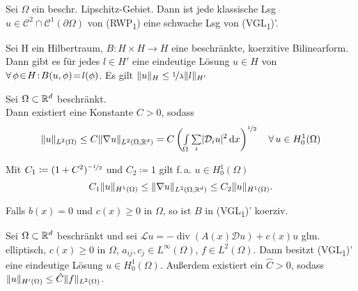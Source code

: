 \documentclass{cheat-sheet}
\newcommand{\Cont}{\mathcal{C}} %
\newcommand{\bOmega}{\partial \Omega} %
\DeclareMathOperator{\dive}{div} %
\newcommand{\tss}[1]{\textsubscript{#1}} %
\newcommand{\DO}{\mathcal{D}} %
\begin{document}
\begin{satz}
  Sei $\Omega$ ein beschr. Lipschitz-Gebiet.
  Dann ist jede klassische Lsg $u \in \Cont^2 \cap \Cont^1(\bOmega)$ von (RWP\tss{1}) eine schwache Lsg von (VGL\tss{1})'.
\end{satz}


\begin{satz}
  Sei H ein Hilbertraum, $B : H \times H \to H$ eine beschränkte, koerzitive Bilinearform.
  Dann gibt es für jedes $l \in H'$ eine eindeutige Lösung $u \in H$ von  $\fa{\phi \!\in\! H\!\!}\!\! B(u, \phi) \!=\! l(\phi)$.
  Es gilt $\lVert u\rVert_H \leq \nicefrac{1}{\lambda} \lVert l\rVert_{H'}$
\end{satz}


\begin{lem}
  Sei $\Omega \subset \mathbb{R}^d$ beschränkt. \\
  Dann existiert eine Konstante $C > 0$, sodass
  \[
    \norm{u}_{L^2(\Omega)} \leq C \norm{\nabla u}_{L^2(\Omega, \R^d)} = C \left( \Int{\Omega}{}{\sum_i \abs{\DO_i u}^2}{x} \right)^{\nicefrac{1}{2}} \quad
    \forall \, u \in H_0^1(\Omega)
  \]
\end{lem}

\begin{kor}
  Mit $C_1 \coloneqq (1 + C^2)^{\nicefrac{-1}{2}}$ und $C_2 \coloneqq 1$ gilt f.\,a. $u \in H_0^1(\Omega)$
  \[ C_1 \lVert u\rVert_{H^1(\Omega)} \leq \lVert\nabla u\rVert_{L^2(\Omega, \mathbb{R}^d)} \leq C_2 \lVert u\rVert_{H^1(\Omega)}. \]
\end{kor}

\begin{lem}
  Falls $b(x) = 0$ und $c(x) \geq 0$ in $\Omega$, so ist $B$ in (VGL\tss{1})' koerziv.
\end{lem}

\begin{satz}
  Sei $\Omega \subset \mathbb{R}^d$ beschränkt und sei $\mathcal{L} u = - \dive (A(x) \DO u) + c(x) u$ glm. elliptisch, $c(x) \geq 0$ in $\Omega$, $a_{ij}, c_j \in L^\infty(\Omega)$, $f \in L^2(\Omega)$.
  Dann besitzt (VGL\tss{1})' eine eindeutige Lösung $u \in H_0^1(\Omega)$.
  Außerdem existiert ein $\hat{C} > 0$, sodass $\lVert u\rVert_{H'(\Omega)} \leq \hat{C} \lVert f\rVert_{L^2(\Omega)}$.
\end{satz}
\end{document}
